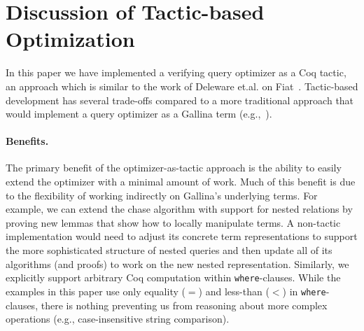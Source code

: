 \documentclass[preprint]{sigplanconf}
\newcommand{\greg}[1]{\textcolor{blue}{GREG: #1}}
\begin{document}



\section{Discussion of Tactic-based Optimization}
\label{sec:discussion}

In this paper we have implemented a verifying query optimizer as a Coq tactic, an approach which is similar to the work of Deleware et.al. on Fiat~\cite{DBLP:conf/popl/DelawarePGC15}.
Tactic-based development has several trade-offs compared to a more traditional approach that would implement a query optimizer as a Gallina term (e.g.,~\cite{coqdb}).


\paragraph{Benefits.}
The primary benefit of the optimizer-as-tactic approach is the ability to easily extend the optimizer with a minimal amount of work.
Much of this benefit is due to the flexibility of working indirectly on Gallina's underlying terms.
For example, we can extend the chase algorithm with support for nested relations by proving new lemmas that show how to locally manipulate terms.
A non-tactic implementation would need to adjust its concrete term representations to support the more sophisticated structure of nested queries and then update all of its algorithms (and proofs) to work on the new nested representation.
Similarly, we explicitly support arbitrary Coq computation within {\tt where}-clauses.
While the examples in this paper use only equality ($=$) and less-than ($<$) in {\tt where}-clauses, there is nothing preventing us from reasoning about more complex operations (e.g., case-insensitive string comparison).
\end{document}
